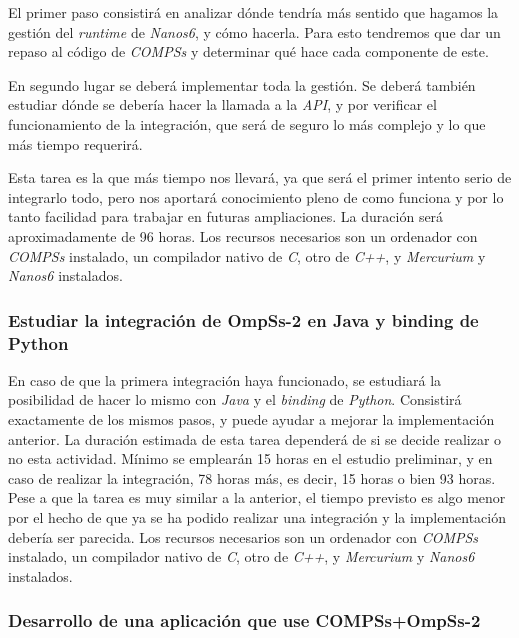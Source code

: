 El primer paso consistirá en analizar dónde tendría más sentido que hagamos la gestión del \textit{runtime} de \textit{Nanos6}, y cómo hacerla. Para esto tendremos que dar un repaso al código de \textit{COMPSs} y determinar qué hace cada componente de este. 
\par\bigksip

En segundo lugar se deberá implementar toda la gestión. Se deberá también estudiar dónde se debería hacer la llamada a la \textit{API}, y por verificar el funcionamiento de la integración, que será de seguro lo más complejo y lo que más tiempo requerirá.
\par\bigskip

Esta tarea es la que más tiempo nos llevará, ya que será el primer intento serio de integrarlo todo, pero nos aportará conocimiento pleno de como funciona y por lo tanto facilidad para trabajar en futuras ampliaciones. La duración será aproximadamente de 96 horas. Los recursos necesarios son un ordenador con \textit{COMPSs} instalado, un compilador nativo de \textit{C}, otro de \textit{C++}, y \textit{Mercurium} y \textit{Nanos6} instalados.

\subsubsection{Estudiar la integración de OmpSs-2 en Java y binding de Python}

En caso de que la primera integración haya funcionado, se estudiará la posibilidad de hacer lo mismo con \textit{Java} y el \textit{binding} de \textit{Python}. Consistirá exactamente de los mismos pasos, y puede ayudar a mejorar la implementación anterior. La duración estimada de esta tarea dependerá de si se decide realizar o no esta actividad. Mínimo se emplearán 15 horas en el estudio preliminar, y en caso de realizar la integración, 78 horas más, es decir, 15 horas o bien 93 horas. Pese a que la tarea es muy similar a la anterior, el tiempo previsto es algo menor por el hecho de que ya se ha podido realizar una integración y la implementación debería ser parecida. Los recursos necesarios son un ordenador con \textit{COMPSs} instalado, un compilador nativo de \textit{C}, otro de \textit{C++}, y \textit{Mercurium} y \textit{Nanos6} instalados.

\subsubsection{Desarrollo de una aplicación que use COMPSs+OmpSs-2}

